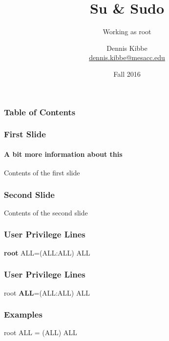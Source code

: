 \documentclass[12pt,handout,aspectratio=169]{beamer}
\title{Su \& Sudo}
\subtitle{Working as root}
\author{Dennis Kibbe\\\href{mailto:dennis.kibbe@mesacc.edu}{dennis.kibbe@mesacc.edu}}
\institute{Mesa Community College\\Network Academy}
\date{Fall 2016}
\begin{document}
\maketitle
\begin{frame}
\frametitle{Table of Contents}
\tableofcontents[currentsection]
\end{frame}
\begin{frame}
\frametitle{First Slide}
\framesubtitle{A bit more information about this}
Contents of the first slide
\end{frame}
\begin{frame}[fragile]
\frametitle{Second Slide}
Contents of the second slide
\end{frame}
\begin{frame}
  \frametitle{User Privilege Lines}
  \begin{block}{}
\begin{semiverbatim}
\textbf{root} ALL=(ALL:ALL) ALL
\end{semiverbatim}
  \end{block}
\end{frame}
\begin{frame}
  \frametitle{User Privilege Lines}
  \begin{block}{}
\begin{semiverbatim}
root \textbf{ALL}=(ALL:ALL) ALL
\end{semiverbatim}
  \end{block}
\end{frame}
\begin{frame}[fragile]
  \frametitle{Examples}
\begin{semiverbatim}
root		ALL = (ALL) ALL
\end{semiverbatim}
\end{frame}
\end{document}

